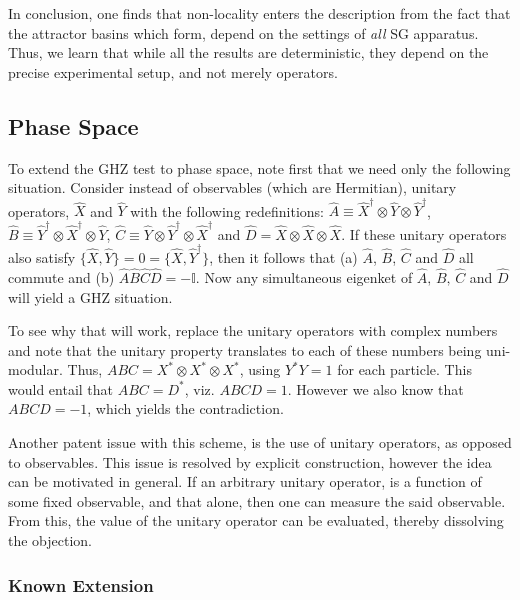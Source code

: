 In conclusion, one finds that non-locality enters the description
from the fact that the attractor basins which form, depend on the
settings of \emph{all} SG apparatus. Thus, we learn that while all
the results are deterministic, they depend on the precise experimental
setup, and not merely operators.


\subsection{Phase Space}

To extend the GHZ test to phase space, note first that we need only
the following situation. Consider instead of observables (which are
Hermitian), unitary operators, $\hat{X}$ and $\hat{Y}$ with the
following redefinitions: $\hat{A}\equiv\hat{X}^{\dagger}\otimes\hat{Y}\otimes\hat{Y}^{\dagger}$,
$\hat{B}\equiv\hat{Y}^{\dagger}\otimes\hat{X}^{\dagger}\otimes\hat{Y}$,
$\hat{C}\equiv\hat{Y}\otimes\hat{Y}^{\dagger}\otimes\hat{X}^{\dagger}$
and $\hat{D}=\hat{X}\otimes\hat{X}\otimes\hat{X}$. If these unitary
operators also satisfy $\{\hat{X},\hat{Y}\}=0=\{\hat{X},\hat{Y}^{\dagger}\}$,
then it follows that (a) $\hat{A}$, $\hat{B}$, $\hat{C}$ and $\hat{D}$
all commute and (b) $\hat{A}\hat{B}\hat{C}\hat{D}=-\mathbb{I}$. Now
any simultaneous eigenket of $\hat{A},\,\hat{B},\,\hat{C}$ and $\hat{D}$
will yield a GHZ situation. 

To see why that will work, replace the unitary operators with complex
numbers and note that the unitary property translates to each of these
numbers being uni-modular. Thus, $ABC=X^{*}\otimes X^{*}\otimes X^{*}$,
using $Y^{*}Y=1$ for each particle. This would entail that $ABC=D^{*}$,
viz. $ABCD=1$. However we also know that $ABCD=-1$, which yields
the contradiction.

Another patent issue with this scheme, is the use of unitary operators,
as opposed to observables. This issue is resolved by explicit construction,
however the idea can be motivated in general. If an arbitrary unitary
operator, is a function of some fixed observable, and that alone,
then one can measure the said observable. From this, the value of
the unitary operator can be evaluated, thereby dissolving the objection.


\subsubsection{Known Extension}

